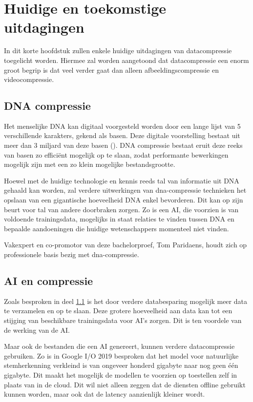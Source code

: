 \chapter{Huidige en toekomstige uitdagingen}
\label{ch:uitdagingen}

In dit korte hoofdstuk zullen enkele huidige uitdagingen van \gls{datacompressie} toegelicht worden. Hiermee zal worden aangetoond dat \gls{datacompressie} een enorm groot begrip is dat veel verder gaat dan alleen \gls{afbeeldingscompressie} en \gls{videocompressie}.

\section{DNA compressie}
\label{sec:uitdagingen-dna-compressie}

Het menselijke DNA kan digitaal voorgesteld worden door een lange lijst van 5 verschillende karakters, gekend als basen. Deze digitale voorstelling bestaat uit meer dan 3 miljard van deze basen (\cite{dodanaugent2011}). DNA compressie bestaat eruit deze reeks van basen zo efficiënt mogelijk op te slaan, zodat performante bewerkingen mogelijk zijn met een zo klein mogelijke bestandsgrootte.

Hoewel met de huidige technologie en kennis reeds tal van informatie uit DNA gehaald kan worden, zal verdere uitwerkingen van \gls{dna-compressie} technieken het opslaan van een gigantische hoeveelheid DNA enkel bevorderen.  Dit kan op zijn beurt voor tal van andere doorbraken zorgen. Zo is een AI, die voorzien is van voldoende trainingsdata, mogelijks in staat relaties te vinden tussen DNA en bepaalde aandoeningen die huidige wetenschappers momenteel niet vinden.

Vakexpert en co-promotor van deze bachelorproef, Tom Paridaens, houdt zich op professionele basis bezig met \gls{dna-compressie}.

\section{AI en compressie}
\label{sec:uitdagingen-ai}

Zoals besproken in deel \ref{sec:uitdagingen-dna-compressie} is het door verdere databesparing mogelijk meer data te verzamelen en op te slaan. Deze grotere hoeveelheid aan data kan tot een stijging van beschikbare trainingsdata voor AI's zorgen. Dit is ten voordele van de werking van de AI.

Maar ook de bestanden die een AI genereert, kunnen verdere \gls{datacompressie} gebruiken. Zo is in Google I/O 2019 besproken dat het model voor natuurlijke stemherkenning verkleind is van ongeveer honderd gigabyte naar nog geen één gigabyte. Dit maakt het mogelijk de modellen te voorzien op toestellen zelf in plaats van in de cloud. Dit wil niet alleen zeggen dat de diensten offline gebruikt kunnen worden, maar ook dat de latency aanzienlijk kleiner wordt. 

